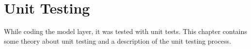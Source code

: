 \chapter{Unit Testing}
While coding the model layer, it was tested with unit tests. This chapter contains some theory about unit testing and a description of the unit testing process.